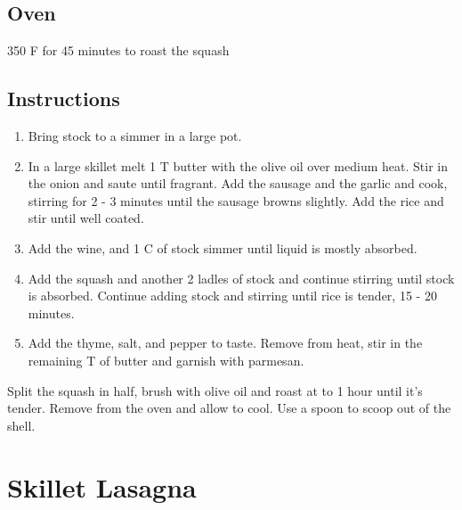\documentclass[letterpaper,10pt,english]{sphinxmanual}
\begin{document}
\section{Oven}
\label{\detokenize{RSRisotto:oven}}
350 F for 45 minutes to roast the squash


\section{Instructions}
\label{\detokenize{RSRisotto:instructions}}\begin{enumerate}
\item {} 
Bring stock to a simmer in a large pot.

\item {} 
In a large skillet melt 1 T butter with the olive oil over medium heat. Stir in the onion and saute until fragrant. Add the sausage and the garlic and cook, stirring for 2 - 3 minutes until the sausage browns slightly. Add the rice and stir until well coated.

\item {} 
Add the wine, and 1 C of stock simmer until liquid is mostly absorbed.

\item {} 
Add the squash and another 2 ladles of stock and continue stirring until stock is absorbed. Continue adding stock and stirring until rice is tender, 15 - 20 minutes.

\item {} 
Add the thyme, salt, and pepper to taste. Remove from heat, stir in the remaining T of butter and garnish with parmesan.

\end{enumerate}


Split the squash in half, brush with olive oil and roast at  to 1 hour until it’s tender. Remove from the oven and allow to cool. Use a spoon to scoop out of the shell.


\chapter{Skillet Lasagna}
\label{\detokenize{Skillet_Las:skillet-lasagna}}\label{\detokenize{Skillet_Las::doc}}
\end{document}
